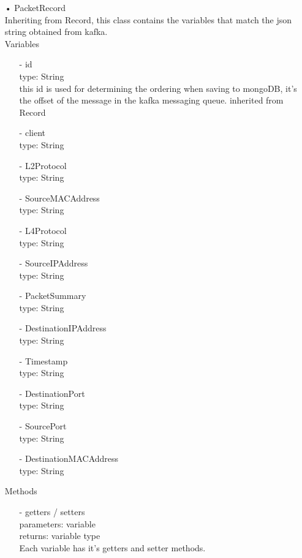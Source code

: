 \documentclass[oneside, english, final]{design}
\begin{document}
\begin{itemize}
	\item[•]PacketRecord
	      \\Inheriting from Record, this class contains the variables that match the json string obtained from kafka.
	      \\Variables
	      \begin{itemize}
		      \item[-] id
		            \\type: String
		            \\this id is used for determining the ordering when saving to mongoDB, it's the offset of the message in the kafka messaging queue. inherited from Record
		      \item[-] client
		            \\type: String
		      \item[-] L2Protocol
		            \\type: String
		      \item[-] SourceMACAddress
		            \\type: String
		      \item[-] L4Protocol
		            \\type: String
		      \item[-] SourceIPAddress
		            \\type: String
		      \item[-] PacketSummary
		            \\type: String
		      \item[-] DestinationIPAddress
		            \\type: String
		      \item[-] Timestamp
		            \\type: String
		      \item[-] DestinationPort
		            \\type: String
		      \item[-] SourcePort
		            \\type: String
		      \item[-] DestinationMACAddress
		            \\type: String

	      \end{itemize}

	      Methods
	      \begin{itemize}
		      \item[-]getters / setters
		            \\parameters: variable
		            \\returns: variable type
		            \\Each variable has it's getters and setter methods.
	      \end{itemize}


\end{itemize}
\end{document}
